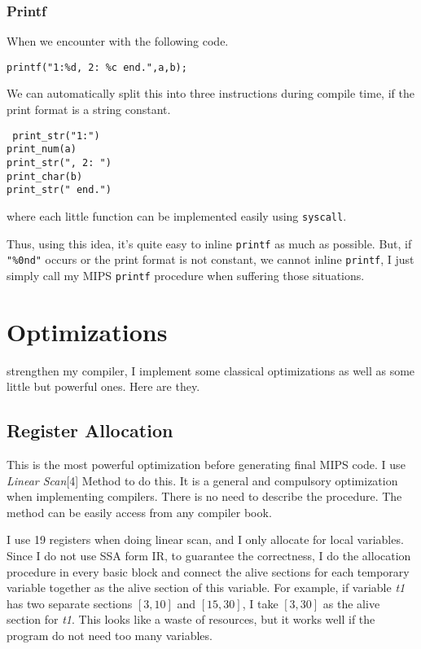 \documentclass[journal]{IEEEtran}
\begin{document}
\subsubsection{Printf}
When we encounter with the following code.
\begin{center}
\texttt{printf("1:\%d, 2: \%c end.",a,b);}
\end{center}
We can automatically split this into three instructions during compile time, if the print format is a string constant.
\begin{center}
\texttt{
	print\_str("1:") \ \ \ \ \ \\
	print\_num(a) \ \ \ \ \ \ \ \\
	print\_str(", 2: ") \\
	print\_char(b) \ \ \ \ \ \ \\
	print\_str(" end.") \\
}
\end{center}
where each little function can be implemented easily using \texttt{syscall}.

Thus, using this idea, it's quite easy to inline \texttt{printf} as much as possible. But, if \texttt{"\%0nd"} occurs or the print format is not constant, we cannot inline \texttt{printf}, I just simply call my MIPS \texttt{printf} procedure when suffering those situations.

\section{Optimizations}

 strengthen my compiler, I implement some classical optimizations as well as some little but powerful ones. Here are they.

\subsection{Register Allocation}
This is the most powerful optimization before generating final MIPS code. I use \textit{Linear Scan}[4] Method to do this. It is a general and compulsory optimization when implementing compilers. There is no need to describe the procedure. The method can be easily access from any compiler book.

I use 19 registers when doing linear scan, and I only allocate for local variables. Since I do not use SSA form IR, to guarantee the correctness, I do the allocation procedure in every basic block and connect the alive sections for each temporary variable together as the alive section of this variable. For example, if variable \textit{t1} has two separate sections $[3,10]$ and $[15,30]$, I take $[3,30]$ as the alive section for \textit{t1}. This looks like a waste of resources, but it works well if the program do not need too many variables.
\end{document}
